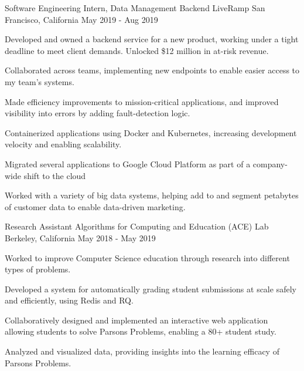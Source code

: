 

\begin{cventries}

    \cventry
      {Software Engineering Intern, Data Management Backend}
      {LiveRamp}
      {San Francisco, California}
      {May 2019 - Aug 2019}
      {
        \begin{cvitems}
          \item Developed and owned a backend service for a new product, working under a tight deadline to meet client demands. Unlocked \$12 million in at-risk revenue.
          \item Collaborated across teams, implementing new endpoints to enable easier access to my team's systems.
          \item Made efficiency improvements to mission-critical applications, and improved visibility into errors by adding fault-detection logic.
          \item Containerized applications using Docker and Kubernetes, increasing development velocity and enabling scalability.
          \item Migrated several applications to Google Cloud Platform as part of a company-wide shift to the cloud
          \item Worked with a variety of big data systems, helping add to and segment petabytes of customer data to enable data-driven marketing.
        \end{cvitems}
      }

    \cventry
      {Research Assistant}
      {Algorithms for Computing and Education (ACE) Lab}
      {Berkeley, California}
      {May 2018 - May 2019}
      {
        \begin{cvitems}
          \item Worked to improve Computer Science education through research into different types of problems.
          \item Developed a system for automatically grading student submissions at scale safely and efficiently, using Redis and RQ.
          \item Collaboratively designed and implemented an interactive web application allowing students to solve Parsons Problems, enabling a 80+ student study. 
          \item Analyzed and visualized data, providing insights into the learning efficacy of Parsons Problems.
        \end{cvitems}  
      }

\end{cventries}
